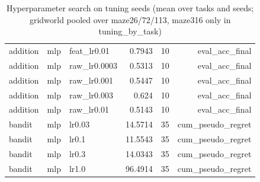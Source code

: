 \begin{table}[t]
\begin{tabular}{lllrrr}
addition & mlp & feat\_lr0.01 & 0.7943 & 10 & eval\_acc\_final \\
addition & mlp & raw\_lr0.0003 & 0.5313 & 10 & eval\_acc\_final \\
addition & mlp & raw\_lr0.001 & 0.5447 & 10 & eval\_acc\_final \\
addition & mlp & raw\_lr0.003 & 0.624 & 10 & eval\_acc\_final \\
addition & mlp & raw\_lr0.01 & 0.5143 & 10 & eval\_acc\_final \\
bandit & mlp & lr0.03 & 14.5714 & 35 & cum\_pseudo\_regret \\
bandit & mlp & lr0.1 & 11.5543 & 35 & cum\_pseudo\_regret \\
bandit & mlp & lr0.3 & 14.0343 & 35 & cum\_pseudo\_regret \\
bandit & mlp & lr1.0 & 96.4914 & 35 & cum\_pseudo\_regret \\
\bottomrule
\end{tabular}
\caption{Hyperparameter search on tuning seeds (mean over tasks and seeds; gridworld pooled over maze26/72/113, maze316 only in tuning\_by\_task)}
\label{tab:tuning_grids}
\end{table}